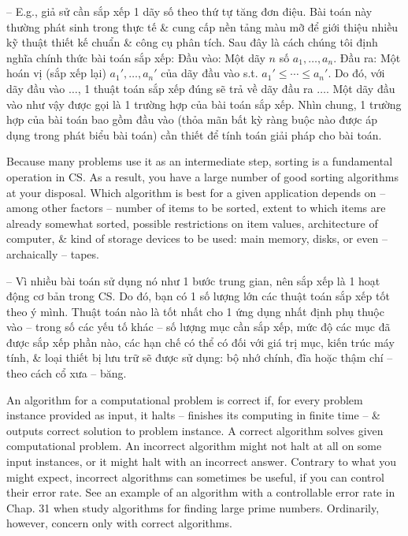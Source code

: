 \documentclass{article}
\begin{document}
\begin{itemize}
\begin{itemize}
\begin{itemize}
            -- E.g., giả sử cần sắp xếp 1 dãy số theo thứ tự tăng đơn điệu. Bài toán này thường phát sinh trong thực tế \& cung cấp nền tảng màu mỡ để giới thiệu nhiều kỹ thuật thiết kế chuẩn \& công cụ phân tích. Sau đây là cách chúng tôi định nghĩa chính thức bài toán sắp xếp: Đầu vào: Một dãy $n$ số $a_1,\ldots,a_n$. Đầu ra: Một hoán vị (sắp xếp lại) $a_1',\ldots,a_n'$ của dãy đầu vào s.t. $a_1'\le\cdots\le a_n'$. Do đó, với dãy đầu vào $\ldots$, 1 thuật toán sắp xếp đúng sẽ trả về dãy đầu ra $\ldots$. Một dãy đầu vào như vậy được gọi là 1 trường hợp của bài toán sắp xếp. Nhìn chung, 1 trường hợp của bài toán bao gồm đầu vào (thỏa mãn bất kỳ ràng buộc nào được áp dụng trong phát biểu bài toán) cần thiết để tính toán giải pháp cho bài toán.
            
            Because many problems use it as an intermediate step, sorting is a fundamental operation in CS. As a result, you have a large number of good sorting algorithms at your disposal. Which algorithm is best for a given application depends on -- among other factors -- number of items to be sorted, extent to which items are already somewhat sorted, possible restrictions on item values, architecture of computer, \& kind of storage devices to be used: main memory, disks, or even -- archaically -- tapes.
            
            -- Vì nhiều bài toán sử dụng nó như 1 bước trung gian, nên sắp xếp là 1 hoạt động cơ bản trong CS. Do đó, bạn có 1 số lượng lớn các thuật toán sắp xếp tốt theo ý mình. Thuật toán nào là tốt nhất cho 1 ứng dụng nhất định phụ thuộc vào -- trong số các yếu tố khác -- số lượng mục cần sắp xếp, mức độ các mục đã được sắp xếp phần nào, các hạn chế có thể có đối với giá trị mục, kiến trúc máy tính, \& loại thiết bị lưu trữ sẽ được sử dụng: bộ nhớ chính, đĩa hoặc thậm chí -- theo cách cổ xưa -- băng.
            
            An algorithm for a computational problem is correct if, for every problem instance provided as input, it halts -- finishes its computing in finite time -- \& outputs correct solution to problem instance. A correct algorithm solves given computational problem. An incorrect algorithm might not halt at all on some input instances, or it might halt with an incorrect answer. Contrary to what you might expect, incorrect algorithms can sometimes be useful, if you can control their error rate. See an example of an algorithm with a controllable error rate in Chap. 31 when study algorithms for finding large prime numbers. Ordinarily, however, concern only with correct algorithms.
            

\end{itemize}
\end{itemize}
\end{itemize}
\end{document}
